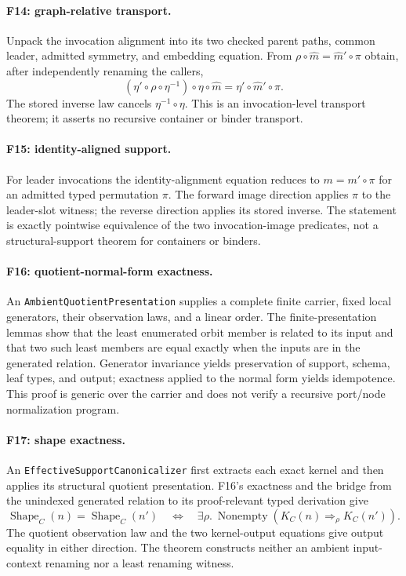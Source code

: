 \paragraph{F14: graph-relative transport.}
\label{app:proof-F14}
Unpack the invocation alignment into its two checked parent paths, common
leader, admitted symmetry, and embedding equation.  From
$\rho\circ\widehat m=\widehat m'\circ\pi$ obtain, after independently
renaming the callers,
\[
(\eta'\circ\rho\circ\eta^{-1})\circ\eta\circ\widehat m
=\eta'\circ\widehat m'\circ\pi.
\]
The stored inverse law cancels $\eta^{-1}\circ\eta$.  This is an
invocation-level transport theorem; it asserts no recursive container or
binder transport.

\paragraph{F15: identity-aligned support.}
\label{app:proof-F15}
For leader invocations the identity-alignment equation reduces to
$m=m'\circ\pi$ for an admitted typed permutation $\pi$.  The forward image
direction applies $\pi$ to the leader-slot witness; the reverse direction
applies its stored inverse.  The statement is exactly pointwise equivalence of
the two invocation-image predicates, not a structural-support theorem for
containers or binders.

\paragraph{F16: quotient-normal-form exactness.}
\label{app:proof-F16}
An \texttt{AmbientQuotientPresentation} supplies a complete finite carrier,
fixed local generators, their observation laws, and a linear order.  The
finite-presentation lemmas show that the least enumerated orbit member is
related to its input and that two such least members are equal exactly when
the inputs are in the generated relation.  Generator invariance yields
preservation of support, schema, leaf types, and output; exactness applied to
the normal form yields idempotence.  This proof is generic over the carrier
and does not verify a recursive port/node normalization program.

\paragraph{F17: shape exactness.}
\label{app:proof-F17}
An \texttt{EffectiveSupportCanonicalizer} first extracts each exact kernel and
then applies its structural quotient presentation.  F16's exactness and the
bridge from the unindexed generated relation to its proof-relevant typed
derivation give
\[
\operatorname{Shape}_C(n)=\operatorname{Shape}_C(n')
\quad\Longleftrightarrow\quad
\exists\rho.\ \operatorname{Nonempty}(K_C(n)\Rightarrow_\rho K_C(n')).
\]
The quotient observation law and the two kernel-output equations give output
equality in either direction.  The theorem constructs neither an ambient
input-context renaming nor a least renaming witness.


